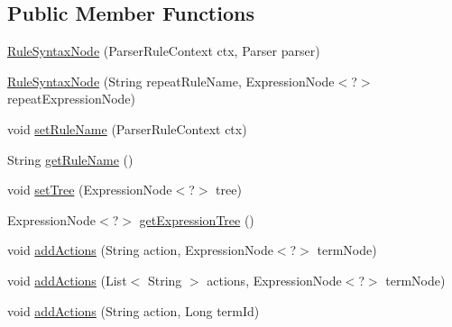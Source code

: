 \subsection*{Public Member Functions}
\begin{DoxyCompactItemize}
\item 
\hyperlink{classit_1_1emarolab_1_1cagg_1_1core_1_1language_1_1syntax_1_1abstractTree_1_1syntaxNodeType_1_1RuleSyntaxNode_a78ce2c4f7c80f081b605a0cce850d866}{Rule\-Syntax\-Node} (Parser\-Rule\-Context ctx, Parser parser)
\item 
\hyperlink{classit_1_1emarolab_1_1cagg_1_1core_1_1language_1_1syntax_1_1abstractTree_1_1syntaxNodeType_1_1RuleSyntaxNode_aa6a44268950a8b92d94c5a4e7a82d77c}{Rule\-Syntax\-Node} (String repeat\-Rule\-Name, Expression\-Node$<$?$>$ repeat\-Expression\-Node)
\item 
void \hyperlink{classit_1_1emarolab_1_1cagg_1_1core_1_1language_1_1syntax_1_1abstractTree_1_1syntaxNodeType_1_1RuleSyntaxNode_a62b042a424e6fa3e7ce9d4f8e80229cc}{set\-Rule\-Name} (Parser\-Rule\-Context ctx)
\item 
String \hyperlink{classit_1_1emarolab_1_1cagg_1_1core_1_1language_1_1syntax_1_1abstractTree_1_1syntaxNodeType_1_1RuleSyntaxNode_a3118c489e2888cbed78437efda4b73ba}{get\-Rule\-Name} ()
\item 
void \hyperlink{classit_1_1emarolab_1_1cagg_1_1core_1_1language_1_1syntax_1_1abstractTree_1_1syntaxNodeType_1_1RuleSyntaxNode_a1fd7141ee492ad99f991cc981e69227d}{set\-Tree} (Expression\-Node$<$?$>$ tree)
\item 
Expression\-Node$<$?$>$ \hyperlink{classit_1_1emarolab_1_1cagg_1_1core_1_1language_1_1syntax_1_1abstractTree_1_1syntaxNodeType_1_1RuleSyntaxNode_a5d3440b63b19ae3e92d61048d78c7f68}{get\-Expression\-Tree} ()
\item 
void \hyperlink{classit_1_1emarolab_1_1cagg_1_1core_1_1language_1_1syntax_1_1abstractTree_1_1syntaxNodeType_1_1RuleSyntaxNode_a61302ad49a08574c0bbb69a8ab9b6008}{add\-Actions} (String action, Expression\-Node$<$?$>$ term\-Node)
\item 
void \hyperlink{classit_1_1emarolab_1_1cagg_1_1core_1_1language_1_1syntax_1_1abstractTree_1_1syntaxNodeType_1_1RuleSyntaxNode_ad3344ad2f2e39b9ac5f74e3ea1bcc8d5}{add\-Actions} (List$<$ String $>$ actions, Expression\-Node$<$?$>$ term\-Node)
\item 
void \hyperlink{classit_1_1emarolab_1_1cagg_1_1core_1_1language_1_1syntax_1_1abstractTree_1_1syntaxNodeType_1_1RuleSyntaxNode_a7d169fe256b1e3eb6372f05625994e5c}{add\-Actions} (String action, Long term\-Id)

\end{DoxyCompactItemize}
